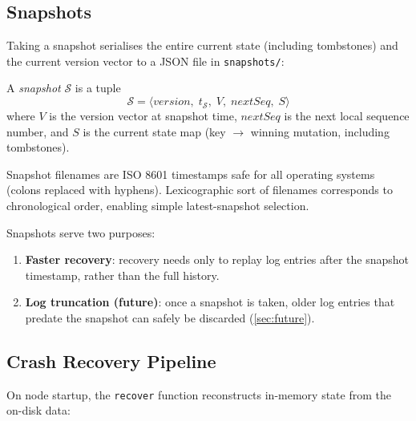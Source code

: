 \subsection{Snapshots}

Taking a snapshot serialises the entire current state (including tombstones)
and the current version vector to a JSON file in \texttt{snapshots/}:

\begin{definition}[Snapshot]
A \emph{snapshot} $\mathcal{S}$ is a tuple
\[
  \mathcal{S} = \langle \mathit{version},\; t_\mathcal{S},\; V,\;
                        \mathit{nextSeq},\; S \rangle
\]
where $V$ is the version vector at snapshot time, $\mathit{nextSeq}$ is the
next local sequence number, and $S$ is the current state map
(key $\to$ winning mutation, including tombstones).
\end{definition}

Snapshot filenames are ISO 8601 timestamps safe for all operating systems
(colons replaced with hyphens). Lexicographic sort of filenames corresponds to
chronological order, enabling simple latest-snapshot selection.

Snapshots serve two purposes:
\begin{enumerate}[leftmargin=1.5em]
  \item \textbf{Faster recovery}: recovery needs only to replay log entries
        after the snapshot timestamp, rather than the full history.
  \item \textbf{Log truncation (future)}: once a snapshot is taken, older log
        entries that predate the snapshot can safely be discarded (\cref{sec:future}).
\end{enumerate}

\subsection{Crash Recovery Pipeline}

On node startup, the \texttt{recover} function reconstructs in-memory state
from the on-disk data:

